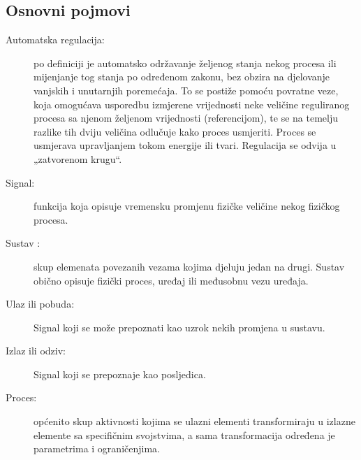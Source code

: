 \documentclass[times, utf8, diplomski]{fer}
\begin{document}
\subsection{Osnovni pojmovi}
\begin{description}
\item[Automatska regulacija:] po definiciji je automatsko održavanje željenog stanja nekog procesa ili  mijenjanje  tog  stanja  po  određenom zakonu,  bez obzira  na  djelovanje  vanjskih  i unutarnjih  poremećaja.  To  se  postiže  pomoću povratne  veze,  koja  omogućava  usporedbu izmjerene  vrijednosti  neke  veličine  reguliranog  procesa  sa  njenom  željenom  vrijednosti (referencijom),  te  se  na  temelju  razlike  tih  dviju veličina  odlučuje  kako  proces  usmjeriti. Proces  se  usmjerava  upravljanjem  tokom  energije  ili tvari. Regulacija se odvija u „zatvorenom krugu“.
\item[Signal:] funkcija koja opisuje vremensku promjenu fizičke veličine nekog fizičkog procesa. 
\item[Sustav :] skup elemenata povezanih vezama kojima djeluju jedan na drugi.  Sustav  obično 
opisuje fizički proces, uređaj ili međusobnu vezu uređaja.
\item[Ulaz ili pobuda:] Signal  koji  se  može  prepoznati  kao  uzrok  nekih  promjena  u  sustavu.
\item[Izlaz ili odziv:] Signal koji se prepoznaje kao posljedica.
\item[Proces:] općenito  skup  aktivnosti  kojima  se  ulazni  elementi  transformiraju  u  izlazne elemente  sa  specifičnim  svojstvima,  a  sama    transformacija  određena  je  parametrima  i ograničenjima.
\end{description}  
\end{document}
